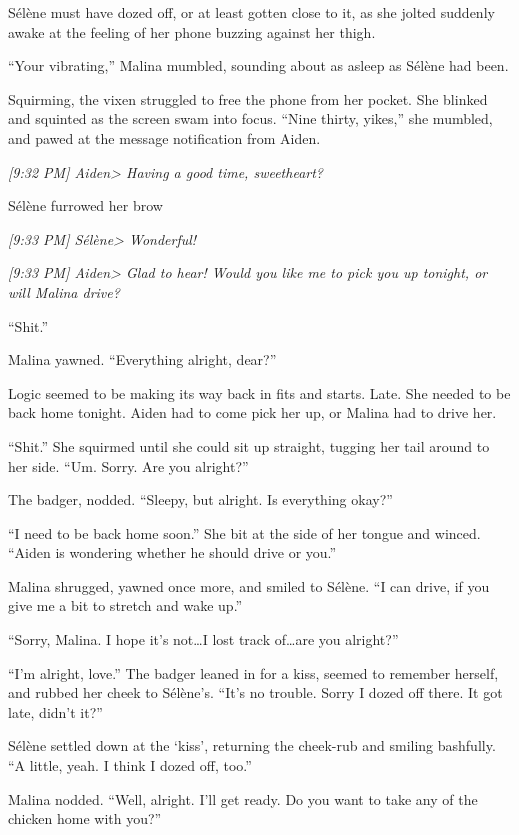 Sélène must have dozed off, or at least gotten close to it, as she jolted suddenly awake at the feeling of her phone buzzing against her thigh.

``Your vibrating,'' Malina mumbled, sounding about as asleep as Sélène had been.

Squirming, the vixen struggled to free the phone from her pocket. She blinked and squinted as the screen swam into focus. ``Nine thirty, yikes,'' she mumbled, and pawed at the message notification from Aiden.

\emph{{[}9:32 PM{]} Aiden\textgreater{} Having a good time, sweetheart?}

Sélène furrowed her brow

\emph{{[}9:33 PM{]} Sélène\textgreater{} Wonderful!}

\emph{{[}9:33 PM{]} Aiden\textgreater{} Glad to hear! Would you like me to pick you up tonight, or will Malina drive?}

``Shit.''

Malina yawned. ``Everything alright, dear?''

Logic seemed to be making its way back in fits and starts. Late. She needed to be back home tonight. Aiden had to come pick her up, or Malina had to drive her.

``Shit.'' She squirmed until she could sit up straight, tugging her tail around to her side. ``Um. Sorry. Are you alright?''

The badger, nodded. ``Sleepy, but alright. Is everything okay?''

``I need to be back home soon.'' She bit at the side of her tongue and winced. ``Aiden is wondering whether he should drive or you.''

Malina shrugged, yawned once more, and smiled to Sélène. ``I can drive, if you give me a bit to stretch and wake up.''

``Sorry, Malina. I hope it's not\ldots{}I lost track of\ldots{}are you alright?''

``I'm alright, love.'' The badger leaned in for a kiss, seemed to remember herself, and rubbed her cheek to Sélène's. ``It's no trouble. Sorry I dozed off there. It got late, didn't it?''

Sélène settled down at the `kiss', returning the cheek-rub and smiling bashfully. ``A little, yeah. I think I dozed off, too.''

Malina nodded. ``Well, alright. I'll get ready. Do you want to take any of the chicken home with you?''

